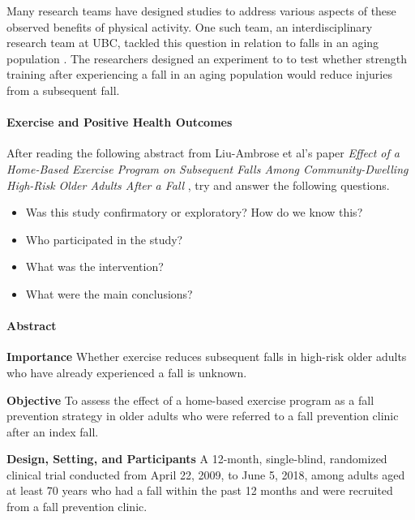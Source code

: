 \documentclass[
]{book}
\providecommand{\tightlist}{%
  \setlength{\itemsep}{0pt}\setlength{\parskip}{0pt}}
\begin{document}
Many research teams have designed studies to address various aspects of these observed benefits of physical activity. One such team, an interdisciplinary research team at UBC, tackled this question in relation to falls in an aging population \citep{liu-ambrose_effect_2019}. The researchers designed an experiment to to test whether strength training after experiencing a fall in an aging population would reduce injuries from a subsequent fall.

\hypertarget{exercise-and-positive-health-outcomes}{%
\paragraph*{Exercise and Positive Health Outcomes}\label{exercise-and-positive-health-outcomes}}

After reading the following abstract from Liu-Ambrose et al's paper \emph{Effect of a Home-Based Exercise Program on Subsequent Falls Among Community-Dwelling High-Risk Older Adults After a Fall} \citep{liu-ambrose_effect_2019}, try and answer the following questions.

\begin{itemize}
\tightlist
\item
  Was this study confirmatory or exploratory? How do we know this?
\item
  Who participated in the study?
\item
  What was the intervention?
\item
  What were the main conclusions?
\end{itemize}

\hypertarget{abstract}{%
\paragraph*{Abstract}\label{abstract}}

\textbf{Importance} Whether exercise reduces subsequent falls in high-risk older adults who have already experienced a fall is unknown.

\textbf{Objective} To assess the effect of a home-based exercise program as a fall prevention strategy in older adults who were referred to a fall prevention clinic after an index fall.

\textbf{Design, Setting, and Participants} A 12-month, single-blind, randomized clinical trial conducted from April 22, 2009, to June 5, 2018, among adults aged at least 70 years who had a fall within the past 12 months and were recruited from a fall prevention clinic.
\end{document}
